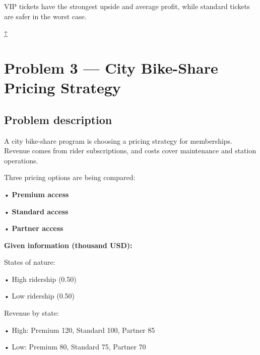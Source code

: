 \documentclass[11pt]{article}
\begin{document}
	
	
	VIP tickets have the strongest upside and average profit, while standard tickets are safer in the worst case.
	
	
	
	\hyperref[problem2-criteria]{↑}
	\section*{Problem 3 — City Bike-Share Pricing Strategy}
	
	\label{problem3}
	
	\subsection*{Problem description}
	
	\label{problem3-problem}
	
	A city bike-share program is choosing a pricing strategy for memberships. Revenue comes from rider subscriptions, and costs
	cover maintenance and station operations.
	
	
	
	
	
	
	Three pricing options are being compared:
	
	
	
	• \textbf{Premium access}
	
	
	
	• \textbf{Standard access}
	
	
	
	• \textbf{Partner access}
	
	
	
	
	
	\textbf{Given information (thousand USD):}
	
	
	
	States of nature:
	
	
	
	• High ridership (0.50)
	
	
	
	• Low ridership (0.50)
	
	
	
	
	
	Revenue by state:
	
	
	
	• High: Premium 120, Standard 100, Partner 85
	
	
	
	• Low: Premium 80, Standard 75, Partner 70
	
	
	
	
	
\end{document}
